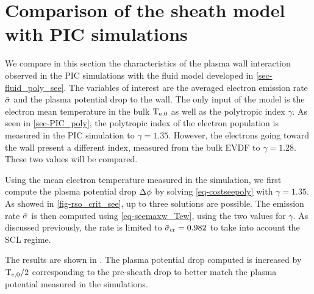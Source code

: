 

\section{Comparison of the sheath model with PIC simulations} \label{subsec-picandmodel}

% 

We compare in this section the characteristics of the plasma wall interaction observed in the \ac{PIC} simulations with the fluid model developed in \cref{sec-fluid_poly_see}.
The variables of interest are the averaged electron emission rate $ \bar{\sigma }$ and the plasma potential drop to the wall.
The only input of the model is the electron mean temperature in the bulk $\mathrm{T_{e, 0}}$ as well as the polytropic index $\gamma$.
As seen in \cref{sec-PIC_poly}, the polytropic index of the electron population is measured in the \ac{PIC} simulation to $\gamma=1.35$.
However, the electrons going toward the wall present a different index, measured from the bulk \ac{EVDF} to $\gamma=1.28$.
These two values will be compared.

Using the mean electron temperature measured in the simulation, we first compute the plasma potential drop $\Delta \phi$ by solving \cref{eq-costseepoly} with $\gamma=1.35$.
As showed in \cref{fig-rso_crit_see}, up to three solutions are possible.
The emission rate $ \bar{\sigma }$ is then computed using \cref{eq-seemaxw_Tew}, using the two values for $\gamma$.
As discussed previously, the rate is limited to $ \bar{\sigma }_{\rm cr}=0.982$ to take into account the \ac{SCL} regime.

The results are shown in .
The plasma potential drop computed is increased by $\mathrm{T_{e, 0}}/2$ corresponding to the pre-sheath drop to better match the plasma potential measured in the simulations.

